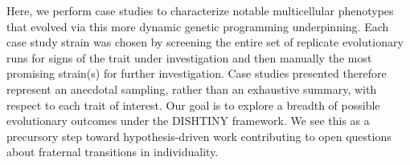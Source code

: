 Here, we perform case studies to characterize notable multicellular phenotypes that evolved via this more dynamic genetic programming underpinning.
Each case study strain was chosen by screening the entire set of replicate evolutionary runs for signs of the trait under investigation and then manually the most promising strain(s) for further investigation.
Case studies presented therefore represent an anecdotal sampling, rather than an exhaustive summary, with respect to each trait of interest.
Our goal is to explore a breadth of possible evolutionary outcomes under the DISHTINY framework.
We see this as a precursory step toward hypothesis-driven work contributing to open questions about fraternal transitions in individuality.
